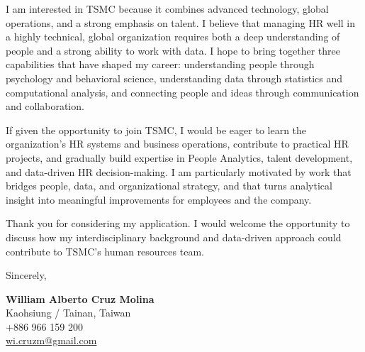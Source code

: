 \documentclass[10.5pt]{article}
\begin{document}
I am interested in TSMC because it combines advanced technology, global operations, and a strong emphasis on talent. I believe that managing HR well in a highly technical, global organization requires both a deep understanding of people and a strong ability to work with data. I hope to bring together three capabilities that have shaped my career: understanding people through psychology and behavioral science, understanding data through statistics and computational analysis, and connecting people and ideas through communication and collaboration.

If given the opportunity to join TSMC, I would be eager to learn the organization's HR systems and business operations, contribute to practical HR projects, and gradually build expertise in People Analytics, talent development, and data-driven HR decision-making. I am particularly motivated by work that bridges people, data, and organizational strategy, and that turns analytical insight into meaningful improvements for employees and the company.

Thank you for considering my application. I would welcome the opportunity to discuss how my interdisciplinary background and data-driven approach could contribute to TSMC's human resources team.

\vspace{0.6em}
Sincerely,

\vspace{1.2em}
\textbf{William Alberto Cruz Molina}\\
Kaohsiung / Tainan, Taiwan\\
+886 966 159 200\\
\href{mailto:wi.cruzm@gmail.com}{wi.cruzm@gmail.com}
\end{document}
